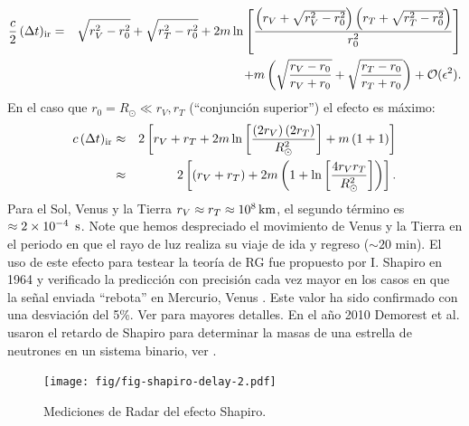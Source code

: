\begin{eqnarray}
\frac{c}{2}\,(\Delta t)_{\rm ir}&=&\sqrt{r_V^2-r_0^2}+\sqrt{r_T^2-r_0^2}+2m\ln\left[\frac{\left(r_V+\sqrt{r_V^2-r_0^2}\right)\left(r_T+\sqrt{r_T^2-r_0^2}\right)}{r_0^2}\right] \nonumber\\
&&+m\left(\sqrt{\frac{r_V-r_0}{r_V+r_0}}+\sqrt{\frac{r_T-r_0}{r_T+r_0}}\right)+\mathcal{O}(\epsilon^2).
\end{eqnarray}
En el caso que $r_0=R_\odot\ll r_V, r_T$ (``conjunción superior'') el efecto es máximo:
\begin{eqnarray}
c\,(\Delta t)_{\rm ir}&\approx& 2\left[r_V+r_T+2m\ln\left[\frac{\left(2r_V\right)\left(2r_T\right)}{R_\odot^2}\right]+m\left(1+1\right) \right]\\
&\approx&2\left[(r_V+r_T)+2m\left(1+\ln\left[\frac{4r_Vr_T}{R_\odot^2}\right]\right)\right].
\end{eqnarray}
Para el Sol, Venus y la Tierra $r_V\approx r_T\approx 10^8\text{\,km}$, el segundo término es $\approx 2\times 10^{-4}\text{\, s}$. Note que hemos despreciado el movimiento de Venus y la Tierra en el periodo en que el rayo de luz realiza su viaje de ida y regreso ($\sim 20\text{ min}$). El uso de este efecto para testear la teoría de RG fue propuesto por I. Shapiro en 1964 \cite{Shapiro64} y verificado la predicción con precisión cada vez mayor en los casos en que la señal enviada ``rebota'' en Mercurio, Venus \cite{Shapiro71}. Este valor ha sido confirmado con una desviación del 5\%. Ver \cite{Wei72} para mayores detalles. En el año 2010 Demorest et al. usaron el retardo de Shapiro para determinar la masas de una estrella de neutrones en un sistema binario, ver \cite{Demorest}.
\begin{figure}[H]
\begin{center}
\texttt{[image: fig/fig-shapiro-delay-2.pdf]}
\caption{Mediciones de Radar del efecto Shapiro.}
\end{center}
\end{figure}
